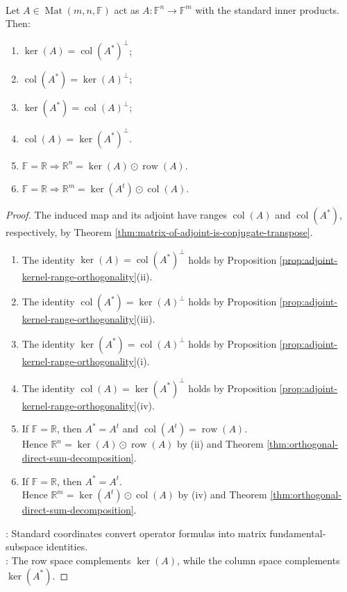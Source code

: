 \begin{corollary} \label{cor:matrix-fundamental-subspaces-orthogonal-complements} \\
Let $A\in\operatorname{Mat}(m,n,\mathbb{F})$ act as $A:\mathbb{F}^n\to\mathbb{F}^m$ with the standard inner products. Then:
\begin{enumerate}[label=(\roman*)]
\setlength{\itemsep}{0pt}
\item $\ker(A)=\operatorname{col}(A^*)^{\perp}$;
\item $\operatorname{col}(A^*)=\ker(A)^{\perp}$;
\item $\ker(A^*)=\operatorname{col}(A)^{\perp}$;
\item $\operatorname{col}(A)=\ker(A^*)^{\perp}$.
\item $\mathbb{F}=\mathbb{R}\Longrightarrow\mathbb{R}^n=\ker(A)\odot\operatorname{row}(A)$.
\item $\mathbb{F}=\mathbb{R}\Longrightarrow\mathbb{R}^m=\ker(A^t)\odot\operatorname{col}(A)$.
\end{enumerate}
\begin{proof}
The induced map and its adjoint have ranges $\operatorname{col}(A)$ and $\operatorname{col}(A^*)$, respectively, by Theorem \ref{thm:matrix-of-adjoint-is-conjugate-transpose}.
\begin{enumerate}[label=(\roman*)]
\setlength{\itemsep}{0pt}
\item The identity $\ker(A)=\operatorname{col}(A^*)^{\perp}$ holds by Proposition \ref{prop:adjoint-kernel-range-orthogonality}(ii).
\item The identity $\operatorname{col}(A^*)=\ker(A)^{\perp}$ holds by Proposition \ref{prop:adjoint-kernel-range-orthogonality}(iii).
\item The identity $\ker(A^*)=\operatorname{col}(A)^{\perp}$ holds by Proposition \ref{prop:adjoint-kernel-range-orthogonality}(i).
\item The identity $\operatorname{col}(A)=\ker(A^*)^{\perp}$ holds by Proposition \ref{prop:adjoint-kernel-range-orthogonality}(iv).
\item If $\mathbb{F}=\mathbb{R}$, then $A^*=A^t$ and $\operatorname{col}(A^t)=\operatorname{row}(A)$.\\
Hence $\mathbb{R}^n=\ker(A)\odot\operatorname{row}(A)$ by (ii) and Theorem \ref{thm:orthogonal-direct-sum-decomposition}.
\item If $\mathbb{F}=\mathbb{R}$, then $A^*=A^t$.\\
Hence $\mathbb{R}^m=\ker(A^t)\odot\operatorname{col}(A)$ by (iv) and Theorem \ref{thm:orthogonal-direct-sum-decomposition}.
\end{enumerate}
: Standard coordinates convert operator formulas into matrix fundamental-subspace identities.\\
: The row space complements $\ker(A)$, while the column space complements $\ker(A^*)$.
\end{proof}
\end{corollary}
